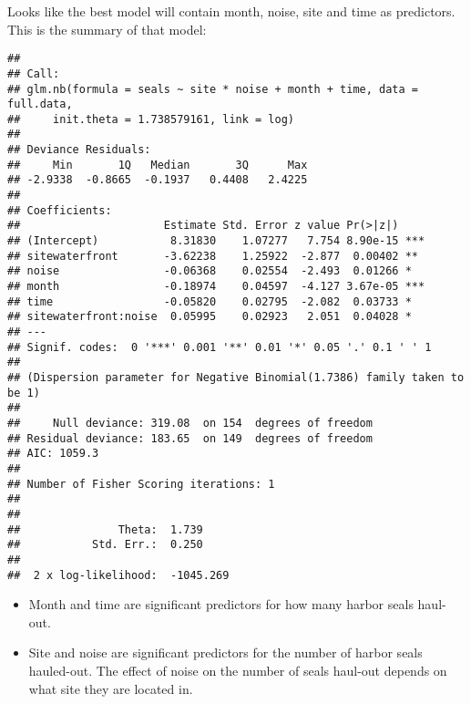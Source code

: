 \documentclass[
]{article}
\begin{document}
Looks like the best model will contain month, noise, site and time as
predictors. This is the summary of that model:

\begin{verbatim}
## 
## Call:
## glm.nb(formula = seals ~ site * noise + month + time, data = full.data, 
##     init.theta = 1.738579161, link = log)
## 
## Deviance Residuals: 
##     Min       1Q   Median       3Q      Max  
## -2.9338  -0.8665  -0.1937   0.4408   2.4225  
## 
## Coefficients:
##                      Estimate Std. Error z value Pr(>|z|)    
## (Intercept)           8.31830    1.07277   7.754 8.90e-15 ***
## sitewaterfront       -3.62238    1.25922  -2.877  0.00402 ** 
## noise                -0.06368    0.02554  -2.493  0.01266 *  
## month                -0.18974    0.04597  -4.127 3.67e-05 ***
## time                 -0.05820    0.02795  -2.082  0.03733 *  
## sitewaterfront:noise  0.05995    0.02923   2.051  0.04028 *  
## ---
## Signif. codes:  0 '***' 0.001 '**' 0.01 '*' 0.05 '.' 0.1 ' ' 1
## 
## (Dispersion parameter for Negative Binomial(1.7386) family taken to be 1)
## 
##     Null deviance: 319.08  on 154  degrees of freedom
## Residual deviance: 183.65  on 149  degrees of freedom
## AIC: 1059.3
## 
## Number of Fisher Scoring iterations: 1
## 
## 
##               Theta:  1.739 
##           Std. Err.:  0.250 
## 
##  2 x log-likelihood:  -1045.269
\end{verbatim}

\begin{itemize}
\item
  Month and time are significant predictors for how many harbor seals
  haul-out.
\item
  Site and noise are significant predictors for the number of harbor
  seals hauled-out. The effect of noise on the number of seals haul-out
  depends on what site they are located in.
\end{itemize}
\end{document}
